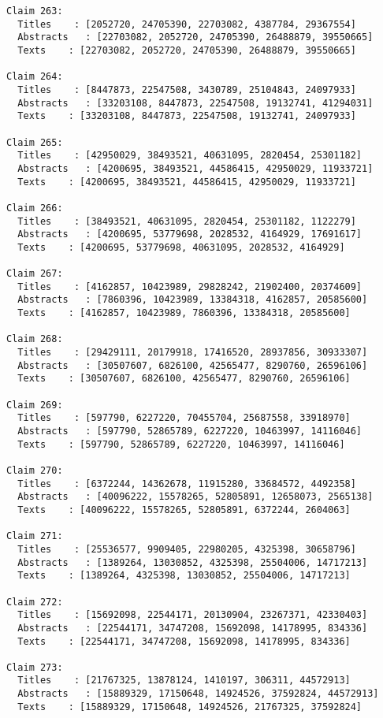 \documentclass[11pt]{article}
\begin{document}
\begin{Verbatim}[commandchars=\\\{\}]
Claim 263:
  Titles    : [2052720, 24705390, 22703082, 4387784, 29367554]
  Abstracts   : [22703082, 2052720, 24705390, 26488879, 39550665]
  Texts    : [22703082, 2052720, 24705390, 26488879, 39550665]

Claim 264:
  Titles    : [8447873, 22547508, 3430789, 25104843, 24097933]
  Abstracts   : [33203108, 8447873, 22547508, 19132741, 41294031]
  Texts    : [33203108, 8447873, 22547508, 19132741, 24097933]

Claim 265:
  Titles    : [42950029, 38493521, 40631095, 2820454, 25301182]
  Abstracts   : [4200695, 38493521, 44586415, 42950029, 11933721]
  Texts    : [4200695, 38493521, 44586415, 42950029, 11933721]

Claim 266:
  Titles    : [38493521, 40631095, 2820454, 25301182, 1122279]
  Abstracts   : [4200695, 53779698, 2028532, 4164929, 17691617]
  Texts    : [4200695, 53779698, 40631095, 2028532, 4164929]

Claim 267:
  Titles    : [4162857, 10423989, 29828242, 21902400, 20374609]
  Abstracts   : [7860396, 10423989, 13384318, 4162857, 20585600]
  Texts    : [4162857, 10423989, 7860396, 13384318, 20585600]

Claim 268:
  Titles    : [29429111, 20179918, 17416520, 28937856, 30933307]
  Abstracts   : [30507607, 6826100, 42565477, 8290760, 26596106]
  Texts    : [30507607, 6826100, 42565477, 8290760, 26596106]

Claim 269:
  Titles    : [597790, 6227220, 70455704, 25687558, 33918970]
  Abstracts   : [597790, 52865789, 6227220, 10463997, 14116046]
  Texts    : [597790, 52865789, 6227220, 10463997, 14116046]

Claim 270:
  Titles    : [6372244, 14362678, 11915280, 33684572, 4492358]
  Abstracts   : [40096222, 15578265, 52805891, 12658073, 2565138]
  Texts    : [40096222, 15578265, 52805891, 6372244, 2604063]

Claim 271:
  Titles    : [25536577, 9909405, 22980205, 4325398, 30658796]
  Abstracts   : [1389264, 13030852, 4325398, 25504006, 14717213]
  Texts    : [1389264, 4325398, 13030852, 25504006, 14717213]

Claim 272:
  Titles    : [15692098, 22544171, 20130904, 23267371, 42330403]
  Abstracts   : [22544171, 34747208, 15692098, 14178995, 834336]
  Texts    : [22544171, 34747208, 15692098, 14178995, 834336]

Claim 273:
  Titles    : [21767325, 13878124, 1410197, 306311, 44572913]
  Abstracts   : [15889329, 17150648, 14924526, 37592824, 44572913]
  Texts    : [15889329, 17150648, 14924526, 21767325, 37592824]


\end{Verbatim}
\end{document}
